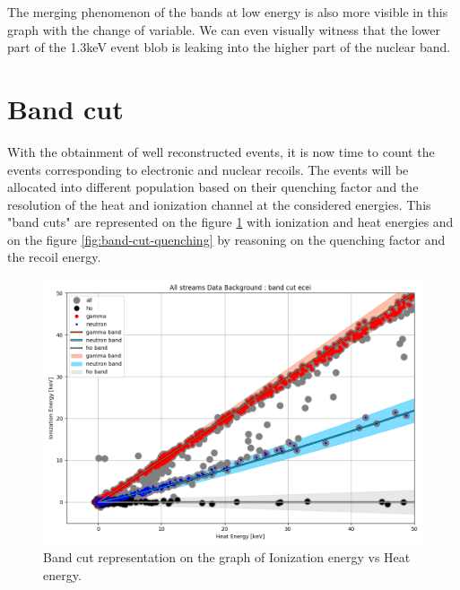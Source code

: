 The merging phenomenon of the bands at low energy is also more visible in this graph with the change of variable. We can even visually witness that the lower part of the 1.3keV event blob is leaking into the higher part of the nuclear band.


\section{Band cut}
\label{par:band-cut}

With the obtainment of well reconstructed events, it is now time to count the events corresponding to electronic and nuclear recoils. The events will be allocated into different population based on their quenching factor and the resolution of the heat and ionization channel at the considered energies. This "band cuts" are represented on the figure \ref{fig:band-cut-ecei} with ionization and heat energies and on the figure \ref{fig:band-cut-quenching} by reasoning on the quenching factor and the recoil energy.

\begin{figure}
\centering
\includegraphics[width=\linewidth,]{Figures/Neutron/band_cut_ecei.png}
\caption{Band cut representation on the graph of Ionization energy vs Heat energy.}
\label{fig:band-cut-ecei}
\end{figure}

